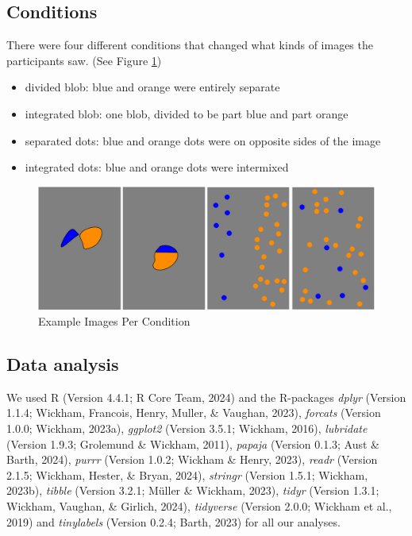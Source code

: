 \documentclass[
  man,floatsintext]{apa6}
\providecommand{\tightlist}{%
  \setlength{\itemsep}{0pt}\setlength{\parskip}{0pt}}
\begin{document}
\subsection{Conditions}\label{conditions}

There were four different conditions that changed what kinds of images the participants saw. (See Figure \ref{fig:formats})

\begin{itemize}
\tightlist
\item
  divided blob: blue and orange were entirely separate
\item
  integrated blob: one blob, divided to be part blue and part orange
\item
  separated dots: blue and orange dots were on opposite sides of the image
\item
  integrated dots: blue and orange dots were intermixed
\end{itemize}

\begin{figure}
\centering
\includegraphics{Probtask_formats.png}
\caption{\label{fig:formats}Example Images Per Condition}
\end{figure}

\subsection{Data analysis}\label{data-analysis}

We used R (Version 4.4.1; R Core Team, 2024) and the R-packages \emph{dplyr} (Version 1.1.4; Wickham, Francois, Henry, Muller, \& Vaughan, 2023), \emph{forcats} (Version 1.0.0; Wickham, 2023a), \emph{ggplot2} (Version 3.5.1; Wickham, 2016), \emph{lubridate} (Version 1.9.3; Grolemund \& Wickham, 2011), \emph{papaja} (Version 0.1.3; Aust \& Barth, 2024), \emph{purrr} (Version 1.0.2; Wickham \& Henry, 2023), \emph{readr} (Version 2.1.5; Wickham, Hester, \& Bryan, 2024), \emph{stringr} (Version 1.5.1; Wickham, 2023b), \emph{tibble} (Version 3.2.1; Müller \& Wickham, 2023), \emph{tidyr} (Version 1.3.1; Wickham, Vaughan, \& Girlich, 2024), \emph{tidyverse} (Version 2.0.0; Wickham et al., 2019) and \emph{tinylabels} (Version 0.2.4; Barth, 2023) for all our analyses.
\end{document}
